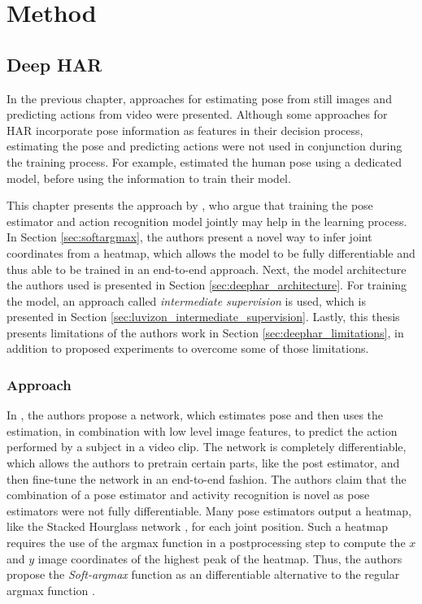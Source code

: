 \chapter{Method}
\section{Deep HAR}
\label{sec:chapter4}
In the previous chapter, approaches for estimating pose from still images and predicting actions from video were presented.
Although some approaches for HAR incorporate pose information as features in their decision process, estimating the pose and predicting actions were not used in conjunction during the training process.
For example, \cite{choutas_potion:_2018}  estimated the human pose using a dedicated model, before using the information to train their model. 

This chapter presents the approach by \cite{luvizon_2d/3d_2018}, who argue that training the pose estimator and action recognition model jointly may help in the learning process.
In Section \ref{sec:softargmax}, the authors present a novel way to infer joint coordinates from a heatmap, which allows the model to be fully differentiable and thus able to be trained in an end-to-end approach.
Next, the model architecture the authors used is presented in Section \ref{sec:deephar_architecture}.
For training the model, an approach called \textit{intermediate supervision} is used, which is presented in Section \ref{sec:luvizon_intermediate_supervision}.
Lastly, this thesis presents limitations of the authors work in Section \ref{sec:deephar_limitations}, in addition to proposed experiments to overcome some of those limitations.

\subsection{Approach}
\label{sec:deephar_approach}

In \cite{luvizon_2d/3d_2018}, the authors propose a network, which estimates pose and then uses the estimation, in combination with low level image features, to predict the action performed by a subject in a video clip.
The network is completely differentiable, which allows the authors to pretrain certain parts, like the post estimator, and then fine-tune the network in an end-to-end fashion.
The authors claim that the combination of a pose estimator and activity recognition is novel as pose estimators were not fully differentiable.
Many pose estimators output a heatmap, like the Stacked Hourglass network \cite{newell_stacked_2016} , for each joint position.
Such a heatmap requires the use of the argmax function in a postprocessing step to compute the $x$ and $y$ image coordinates of the highest peak of the heatmap.
Thus, the authors propose the \textit{Soft-argmax} function as an differentiable alternative to the regular argmax function .

